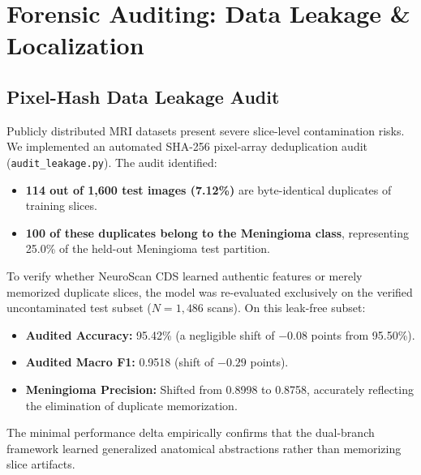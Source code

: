 \documentclass[journal,twocolumn,10pt]{IEEEtran}
\begin{document}
\section{Forensic Auditing: Data Leakage \& Localization}

\subsection{Pixel-Hash Data Leakage Audit}
Publicly distributed MRI datasets present severe slice-level contamination risks. We implemented an automated SHA-256 pixel-array deduplication audit (\texttt{audit\_leakage.py}). The audit identified:
\begin{itemize}
    \item \textbf{114 out of 1,600 test images (7.12\%)} are byte-identical duplicates of training slices.
    \item \textbf{100 of these duplicates belong to the Meningioma class}, representing 25.0\% of the held-out Meningioma test partition.
\end{itemize}

To verify whether NeuroScan CDS learned authentic features or merely memorized duplicate slices, the model was re-evaluated exclusively on the verified uncontaminated test subset ($N = 1,486$ scans). On this leak-free subset:
\begin{itemize}
    \item \textbf{Audited Accuracy:} 95.42\% (a negligible shift of $-0.08$ points from 95.50\%).
    \item \textbf{Audited Macro F1:} 0.9518 (shift of $-0.29$ points).
    \item \textbf{Meningioma Precision:} Shifted from 0.8998 to 0.8758, accurately reflecting the elimination of duplicate memorization.
\end{itemize}
The minimal performance delta empirically confirms that the dual-branch framework learned generalized anatomical abstractions rather than memorizing slice artifacts.
\end{document}
